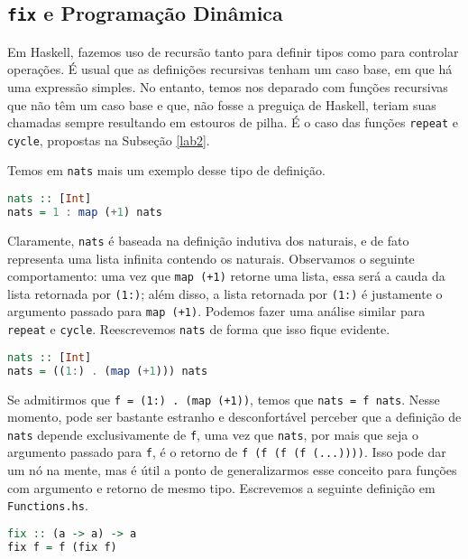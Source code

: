 \documentclass[a4paper]{article}
\begin{document}
\subsection{\texttt{fix} e Programação Dinâmica}

Em Haskell, fazemos uso de recursão tanto para definir tipos como para controlar operações.
É usual que as definições recursivas tenham um caso base, em que há uma expressão simples.
No entanto, temos nos deparado com funções recursivas que não têm um caso base e que, não fosse a preguiça de Haskell, teriam suas chamadas sempre resultando em estouros de pilha.
É o caso das funções \texttt{repeat} e \texttt{cycle}, propostas na Subseção \ref{lab2}.

Temos em \texttt{nats} mais um exemplo desse tipo de definição.

\begin{lstlisting}[language=haskell, frame=single]
nats :: [Int]
nats = 1 : map (+1) nats
\end{lstlisting}

Claramente, \texttt{nats} é baseada na definição indutiva dos naturais, e de fato representa uma lista infinita contendo os naturais.
Observamos o seguinte comportamento:
uma vez que \mbox{\texttt{map (+1)}} retorne uma lista, essa será a cauda da lista retornada por \texttt{(1:)};
além disso, a lista retornada por \texttt{(1:)} é justamente o argumento passado para \texttt{map (+1)}.
Podemos fazer uma análise similar para \texttt{repeat} e \texttt{cycle}.
Reescrevemos \texttt{nats} de forma que isso fique evidente.

\begin{lstlisting}[language=haskell, frame=single]
nats :: [Int]
nats = ((1:) . (map (+1))) nats
\end{lstlisting}

Se admitirmos que \texttt{f = (1:) . (map (+1))}, temos que \texttt{nats = f nats}.
Nesse momento, pode ser bastante estranho e desconfortável perceber que a definição de \texttt{nats} depende exclusivamente de \texttt{f}, uma vez que \texttt{nats}, por mais que seja o argumento passado para \texttt{f}, é o retorno de \texttt{f (f (f (f (...))))}.
Isso pode dar um nó na mente, mas é útil a ponto de generalizarmos esse conceito para funções com argumento e retorno de mesmo tipo.
Escrevemos a seguinte definição em \texttt{Functions.hs}.

\begin{lstlisting}[language=haskell, frame=single]
fix :: (a -> a) -> a
fix f = f (fix f)
\end{lstlisting}
\end{document}
